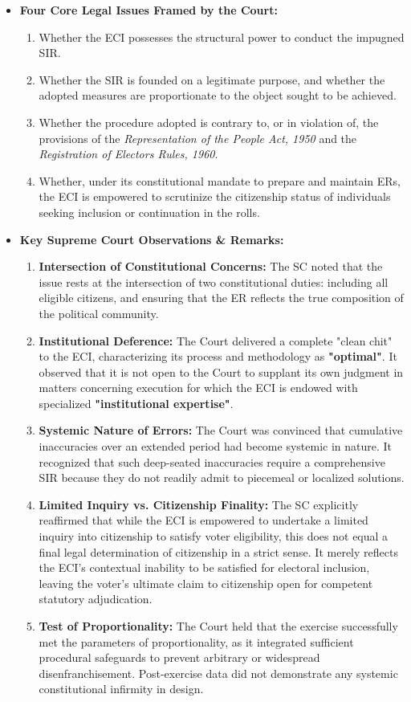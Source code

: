 \begin{itemize}

    \item \textbf{Four Core Legal Issues Framed by the Court:}
    \begin{enumerate}
        \item Whether the ECI possesses the structural power to conduct the impugned SIR.
        \item Whether the SIR is founded on a legitimate purpose, and whether the adopted measures are proportionate to the object sought to be achieved.
        \item Whether the procedure adopted is contrary to, or in violation of, the provisions of the \textit{Representation of the People Act, 1950} and the \textit{Registration of Electors Rules, 1960}.
        \item Whether, under its constitutional mandate to prepare and maintain ERs, the ECI is empowered to scrutinize the citizenship status of individuals seeking inclusion or continuation in the rolls.
    \end{enumerate}

    \item \textbf{Key Supreme Court Observations \& Remarks:}
    \begin{enumerate}
        \item \textbf{Intersection of Constitutional Concerns:} The SC noted that the issue rests at the intersection of two constitutional duties: including all eligible citizens, and ensuring that the ER reflects the true composition of the political community.
        \item \textbf{Institutional Deference:} The Court delivered a complete "clean chit" to the ECI, characterizing its process and methodology as \textbf{"optimal"}. It observed that it is not open to the Court to supplant its own judgment in matters concerning execution for which the ECI is endowed with specialized \textbf{"institutional expertise"}.
        \item \textbf{Systemic Nature of Errors:} The Court was convinced that cumulative inaccuracies over an extended period had become systemic in nature. It recognized that such deep-seated inaccuracies require a comprehensive SIR because they do not readily admit to piecemeal or localized solutions.
        \item \textbf{Limited Inquiry vs. Citizenship Finality:} The SC explicitly reaffirmed that while the ECI is empowered to undertake a limited inquiry into citizenship to satisfy voter eligibility, this does not equal a final legal determination of citizenship in a strict sense. It merely reflects the ECI's contextual inability to be satisfied for electoral inclusion, leaving the voter's ultimate claim to citizenship open for competent statutory adjudication.
        \item \textbf{Test of Proportionality:} The Court held that the exercise successfully met the parameters of proportionality, as it integrated sufficient procedural safeguards to prevent arbitrary or widespread disenfranchisement. Post-exercise data did not demonstrate any systemic constitutional infirmity in design.
    \end{enumerate}


\end{itemize}
